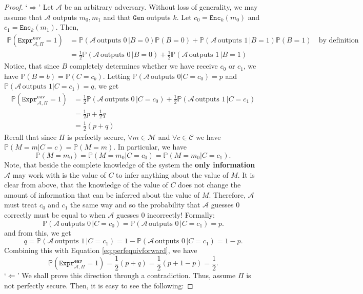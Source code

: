 \documentclass{article}
\theoremstyle{definition}
\newcommand{\Enc}{\texttt{Enc}}
\newcommand{\Gen}{\texttt{Gen}}
\newcommand{\M}{\mathcal{M}}
\renewcommand{\C}{\mathcal{C}}
\newcommand{\A}{\mathcal{A}}
\newcommand{\Prob}{\mathbb{P}}
\newcommand{\Expr}[2]{\texttt{Expr}^{\texttt{#1}}_{#2}}
\begin{document}
\begin{proof}
  `$\Rightarrow$' Let $\A$ be an arbitrary adversary. Without loss
  of generality, we may assume that $\A$ outputs $m_0, m_1$ and that $\Gen$
  outputs $k$. Let $c_0 = \Enc_k(m_0)$ and $c_1 = \Enc_k(m_1)$. Then,
  \begin{align*}
    \Prob(\Expr{eav}{\A, \Pi} = 1) &= \Prob(\A \,\text{outputs 0}\,| B = 0)\Prob(B = 0) + \Prob(\A \,\text{outputs 1}\,| B = 1)\Prob(B = 1) \quad\text{by definition}\\
    &= \frac12\Prob(\A \,\text{outputs 0}\,| B = 0) + \frac12\Prob(\A \,\text{outputs 1}\,| B = 1)
  \end{align*}
  Notice, that since $B$ completely determines whether we have receive $c_0$ or
  $c_1$, we have $\Prob(B = b) = \Prob(C = c_b)$. Letting
  $\Prob(\A\,\text{outputs 0} | C = c_0) = p$ and $\Prob(\A\,\text{outputs 1} |
  C = c_1) = q$, we get
  \begin{equation}
    \begin{split}
    \label{eq:perfequivforward}
    \Prob(\Expr{eav}{\A, \Pi} = 1) &= \frac12 \Prob(\A \, \text{outputs 0} \,| C = c_0) + \frac12 \Prob(\A \,\text{outputs 1}\,| C = c_1) \\
                                   &= \frac12 p + \frac12 q \\
                                   &=  \frac12 (p + q)
    \end{split}
  \end{equation}
  Recall that since $\Pi$ is perfectly secure, $\forall m \in \M$ and $\forall c
  \in \C$ we have $\Prob(M = m | C = c) = \Prob(M = m)$. In particular, we have
  \[
    \Prob(M = m_0) = \Prob(M = m_0 | C = c_0) = \Prob(M = m_0 | C = c_1).
  \]
  Note, that beside the complete knowledge of the system the \textbf{only information} $\A$
  may work with is the value of $C$ to infer anything about the value of $M$.
  It is clear from above, that the knowledge of the value of $C$ does not change
  the amount of information that can be inferred about the value of $M$.
  Therefore, $\A$ must treat $c_0$ and $c_1$ the same way and so the probability that $\A$ guesses $0$ correctly must be equal to when $\A$ guesses
  $0$ incorrectly! Formally:
  \[
    \Prob(\A \, \text{outputs 0} \,| C = c_0) = \Prob(\A \,
    \text{outputs 0} \,| C = c_1) = p.
  \]
  and from this, we get
  \[
  q = \Prob(\A \, \text{outputs 1} \,| C = c_1) =
  1 - \Prob(\A \, \text{outputs 0} \,| C = c_1) = 1 - p.
  \]
  Combining this with Equation \ref{eq:perfequivforward}, we have
  \[
    \Prob(\Expr{eav}{\A, \Pi} = 1) = \frac12 (p + q) = \frac12 (p + 1 - p) = \frac12.
  \]
  `$\Leftarrow$' We shall prove this direction through a contradiction. Thus,
  assume $\Pi$ is not perfectly secure. Then, it is easy to see the following:

\end{proof}
\end{document}
